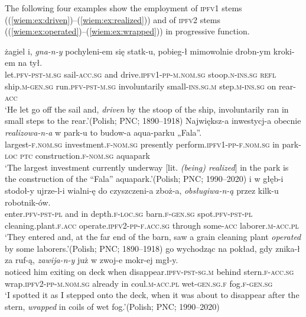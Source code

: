 \documentclass[output=paper]{langscibook}
\begin{document}
The following four examples show the employment of \textsc{ipfv1} stems ((\ref{wiem:ex:driven})--(\ref{wiem:ex:realized})) and of \textsc{ipfv2} stems ((\ref{wiem:ex:operated})--(\ref{wiem:ex:wrapped})) in progressive function.

\ea\label{wiem:ex:driven}
 {żagiel} {i,} {\textit{gna-n-y}} {pochyleni-em} {się} {statk-u,} {pobieg-ł} {mimowolnie} {drobn-ym} {kroki-em} {na} {tył}.\\
let.\textsc{pfv-pst-m.sg} sail-\textsc{acc.sg} and drive.\textsc{ipfv1-pp-m.nom.sg} stoop.\textsc{n-ins.sg} \textsc{refl} ship.\textsc{m-gen.sg} run.\textsc{pfv-pst-m.sg} involuntarily small-\textsc{ins.sg.m} step.\textsc{m-ins.sg} on rear-\textsc{acc}\\
\glt ‘He let go off the sail and, \textit{driven} by the stoop of the ship, involuntarily ran in small steps to the rear.’\hfill (Polish; PNC; 1890--1918)
\ex\label{wiem:ex:realized}{\gll
{Największ-a} {inwestycj-a} {obecnie} {\textit{realizowa-n-a}} {w} {park-u} {to} {budow-a} {aqua-parku „Fala”.}\\
largest-\textsc{f.nom.sg} investment.\textsc{f-nom.sg} presently perform.\textsc{ipfv1-pp-f.nom.sg} in park-\textsc{loc} \textsc{ptc} construction.\textsc{f-nom.sg} aquapark\\
\glt ‘The largest investment currently underway [lit. \textit{(being) realized}] in the park is the construction of the “Fala” aquapark.’\hfill (Polish; PNC; 1990--2020)
}\largerpage
\ex\label{wiem:ex:operated}
 {i} {w} {głęb-i} {stodoł-y} {ujrze-l-i} {wialni-ę do czyszczeni-a zboż-a,} {\textit{obsługiwa-n-ą}} {przez} {kilk-u} {robotnik-ów}.\\
enter.\textsc{pfv-pst-pl} and in depth.\textsc{f-loc.sg} barn.\textsc{f-gen.sg} spot.\textsc{pfv-pst-pl} cleaning.plant.\textsc{f.acc} operate.\textsc{ipfv2-pp-f.acc.sg} through some-\textsc{acc} laborer.\textsc{m-acc.pl}\\
\glt ‘They entered and, at the far end of the barn, saw a grain cleaning plant \textit{operated} by some laborers.’\hfill (Polish; PNC; 1890--1918)
\ex\label{wiem:ex:wrapped}
 {go} {wychodząc} {na} {pokład,} {gdy} {znika-ł} {za} {ruf-ą,} {\textit{zawija-n-y}} {już} {w} {zwoj-e} {mokr-ej} {mgł-y}.\\
noticed him exiting on deck when disappear.\textsc{ipfv-pst-sg.m} behind stern.\textsc{f-acc.sg} wrap.\textsc{ipfv2-pp-m.nom.sg} already in coul.\textsc{m-acc.pl} wet-\textsc{gen.sg.f} fog.\textsc{f-gen.sg}\\
\glt ‘I spotted it as I stepped onto the deck, when it was about to disappear after the stern, \textit{wrapped} in coils of wet fog.’\hfill (Polish; PNC; 1990--2020)
\z
\end{document}
